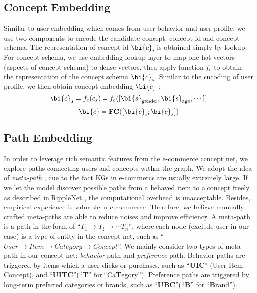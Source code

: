\subsection{Concept Embedding}

Similar to user embedding which comes from user behavior and user profile, we use two components to encode the candidate concept: concept id and concept schema.
The representation of concept id $\bi{c}_i$ is obtained simply by lookup.
For concept schema,
we use embedding lookup layer to map one-hot vectors (aspects of concept schema) to dense vectors, then apply function $f_{c}$ to obtain
the representation of the concept schema $\bi{c}_s$. 
Similar to the encoding of user profile,
we then obtain concept embedding $\bi{c}$ :
\begin{equation}
\label{eqn:fc}
\bi{c}_s = f_c(c_s) = f_c([\bi{s}_{\text{gender}}, \bi{s}_{\text{age}}, \cdots])
\end{equation}
\begin{equation}
\bi{c} = \textbf{FC}([\bi{c}_{i};\bi{c}_{s}])
\end{equation}

\subsection{Path Embedding}
\label{sec:path}
In order to leverage rich semantic features from the e-commerce concept net,
we explore paths connecting users and concepts within the graph.
We adopt the idea of \textit{meta-path} \cite{hu2018leveraging}, due to the fact KGs in e-commerce are usually extremely large.
If we let the model discover possible paths from a behaved item to a concept freely as described in RippleNet \cite{wang2018ripplenet}, 
the computational overhead is unacceptable.
Besides, empirical experience is valuable in e-commerce.
Therefore, we believe manually crafted meta-paths are able to reduce noises and improve efficiency.
A meta-path is a path in the form of ``$T_1 \rightarrow T_2 \rightarrow \cdots T_n$'', where each node (exclude user in our case) is a type of entity in the concept net, such as ``$User \rightarrow Item \rightarrow Category \rightarrow Concept$''.
We mainly consider two types of meta-path in our concept net: \textit{behavior} path and \textit{preference} path.
Behavior paths are triggered by items which a user clicks or purchases, such as ``\textbf{UIC}'' (User-Item-Concept), and  ``\textbf{UITC}''(``\textbf{T}'' for ``Ca\textbf{T}egory'').
Preference paths are triggered by long-term preferred categories or brands, such as ``\textbf{UBC}''(``\textbf{B}'' for ``\textbf{B}rand'').

